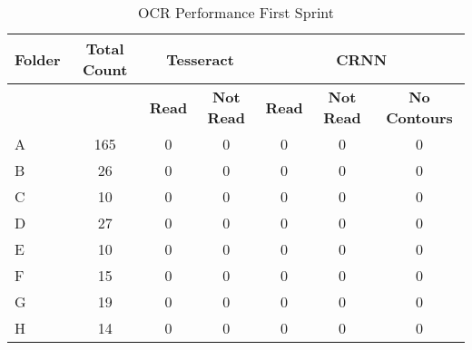 \begin{table}[h]
    \centering
    \caption{OCR Performance First Sprint}
    \label{tab:first_sprint}
    \begin{tabular}{|l|c|c|c|c|c|c|}
        \hline
        \textbf{Folder} & \textbf{Total Count} & \multicolumn{2}{c|}{\textbf{Tesseract}} & \multicolumn{3}{c|}{\textbf{CRNN}}                                                            \\
        \hline
                        &                      & \textbf{Read}                           & \textbf{Not Read}                  & \textbf{Read} & \textbf{Not Read} & \textbf{No Contours} \\
        \hline
        A               & 165                  & 0                                       & 0                                  & 0             & 0                 & 0                    \\
        B               & 26                   & 0                                       & 0                                  & 0             & 0                 & 0                    \\
        C               & 10                   & 0                                       & 0                                  & 0             & 0                 & 0                    \\
        D               & 27                   & 0                                       & 0                                  & 0             & 0                 & 0                    \\
        E               & 10                   & 0                                       & 0                                  & 0             & 0                 & 0                    \\
        F               & 15                   & 0                                       & 0                                  & 0             & 0                 & 0                    \\
        G               & 19                   & 0                                       & 0                                  & 0             & 0                 & 0                    \\
        H               & 14                   & 0                                       & 0                                  & 0             & 0                 & 0                    \\
        \hline
    \end{tabular}
\end{table}


